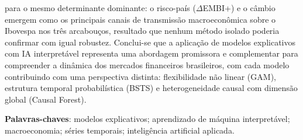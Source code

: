 \documentclass[	12pt, Times, openright, oneside, a4paper, english, brazil]{abntex2}
\begin{document}
\begin{resumo}
para o mesmo determinante dominante: o risco-país ($\Delta$EMBI+) e o câmbio emergem como os principais canais de transmissão macroeconômica sobre o Ibovespa nos três arcabouços, resultado que nenhum método isolado poderia confirmar com igual robustez. Conclui-se que a aplicação de modelos explicativos com IA interpretável representa uma abordagem promissora e complementar para compreender a dinâmica dos mercados financeiros brasileiros, com cada modelo contribuindo com uma perspectiva distinta: flexibilidade não linear (GAM), estrutura temporal probabilística (BSTS) e heterogeneidade causal com dimensão global (Causal Forest).

 \vspace{\onelineskip}

 \noindent
 \textbf{Palavras-chaves}: modelos explicativos; aprendizado de máquina interpretável; macroeconomia; séries temporais; inteligência artificial aplicada.
\end{resumo}
\end{document}
